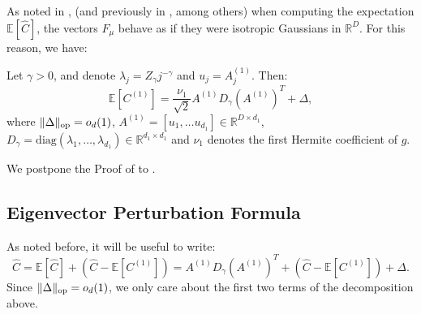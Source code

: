 \documentclass[]{article}
\numberwithin{equation}{section}
\theoremstyle{definition}
\newcommand{\RR}{\mathbb{R}}
\newcommand{\EE}{\mathbb{E}}
\def\op{{\rm op}}
\begin{document}
As noted in \cite{tabanelli2026deep}, (and previously in \cite{wang2023learning,wen2025does}, among others) when computing the expectation $\mathbb{E}\left[\hat{C} \right ]$, the vectors $F_\mu$ behave as if they were isotropic Gaussians in $\RR^{D}$. For this reason, we have: 

\begin{lemma}
Let $\gamma >0$, and denote $\lambda_j = Z_\gamma j^{-\gamma}$ and $u_j = A^{(1)}_j$. Then: 
    \[
    \EE \left [C^{(1)} \right ] = \frac{\nu_{1}}{\sqrt{2}}A^{(1)} D_{\gamma} (A^{(1)})^T + \Delta, 
    \]
    where $\| \Delta \|_\op = o_{d}(1)$,  $A^{(1)} = [u_1, \dots u_{d_1}] \in \mathbb{R}^{D \times d_1}$, $D_\gamma = \mathrm{diag} ( \lambda_1, \dots, \lambda_{d_1}) \in \RR^{d_1 \times d_1}$ and $\nu_{1}$ denotes the first Hermite coefficient of $g$. 
    \label{lemma:expectation_C_1}
\end{lemma}

We postpone the Proof of  to .


\subsection{Eigenvector Perturbation Formula}


As noted before, it will be useful to write: 
\begin{equation}
    \hat{C} = \EE [\hat{C}] + \left (\hat{C} - \EE \left [ C^{(1)}\right ] \right ) = A^{(1)} D_{\gamma} (A^{(1)})^T + \left (\hat{C} - \EE \left [ C^{(1)}\right ] \right ) + \Delta. 
\end{equation}
Since $\| \Delta\|_\op = o_{d}(1)$, we only care about the first two terms of the decomposition above. 
\end{document}
